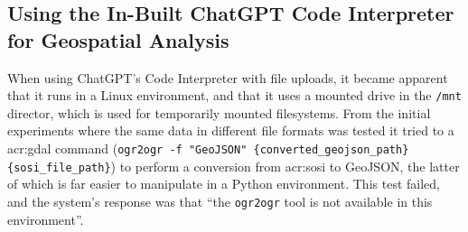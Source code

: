 \begin{comment}
In this section it is important to include a discussion of not just the merits of the work conducted, but also the limitations.
Which choices did you make? Why? What alternatives were there?
{\color{red}\textbf{Note that a key part of the Master's Thesis grading is based on the student's ability to discuss the results in light of the work by others as well as the restrictions and potential of the work itself.}}
While the Results section will report the outcome of each specific experiments, the Discussion should put those results into perspective and look at overall lessons that can be learned from the entire series of experiments.

You should be able to discuss your work in relation to its overall goal and your research questions (i.e., those introduced in Chapter~\ref{cha:introduction}),
but also address issues such as any ethical considerations that the work may entail,
as well as its technical challenges and limitations.

Discussion and evaluation can either be two different chapters, a joint chapter (as here), or part of the concluding chapter
--- or the discussion can be part of that chapter while the evaluation is part of the experimental chapter.

As for most parts of the thesis, it is possible to select various outlines and setups for the discussion; the important thing is that all the relevant parts appear \textit{somewhere\/} in the text.
\end{comment}


\subsection{Using the In-Built ChatGPT Code Interpreter for Geospatial Analysis}

When using ChatGPT's Code Interpreter with file uploads, it became apparent that it runs in a Linux environment, and that it uses a mounted drive  in the \texttt{/mnt} director, which is used for temporarily mounted filesystems. From the initial experiments where the same data in different file formats was tested it tried to a \acrshort{acr:gdal} command (\texttt{ogr2ogr -f "GeoJSON" \{converted\_geojson\_path\} \{sosi\_file\_path\}}) to perform a conversion from \acrshort{acr:sosi} to GeoJSON, the latter of which is far easier to manipulate in a Python environment. This test failed, and the system's response was that \enquote{the \texttt{ogr2ogr} tool is not available in this environment}.

